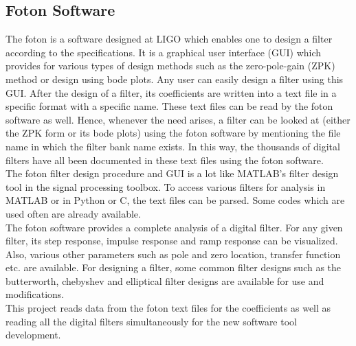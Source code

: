 \documentclass[colorlinks=true,pdfstartview=FitV,linkcolor=blue,
            citecolor=red,urlcolor=magenta]{ligodoc}
\begin{document}
	\subsection{Foton Software}  The foton is a software designed at LIGO which enables one to design a filter according to the specifications. It is a graphical user interface (GUI) which provides for various types of design methods such as the zero-pole-gain (ZPK) method or design using bode plots. Any user can easily design a filter using this GUI. After the design of a filter, its coefficients are written into a text file in a specific format with a specific name. These text files can be read by the foton software as well. Hence, whenever the need arises, a filter can be looked at (either the ZPK form or its bode plots) using the foton software by mentioning the file name in which the filter bank name exists. In this way, the thousands of digital filters have all been documented in these text files using the foton software. \\The foton filter design procedure and GUI is a lot like MATLAB's filter design tool in the signal processing toolbox. To access various filters for analysis in MATLAB or in Python or C, the text files can be parsed. Some codes which are used often are already available. \\
	The foton software provides a complete analysis of a digital filter. For any given filter, its step response, impulse response and ramp response can be visualized. Also, various other parameters such as pole and zero location, transfer function etc. are available. For designing a filter, some common filter designs such as the butterworth, chebyshev and elliptical filter designs are available for use and modifications. \\This project reads data from the foton text files for the coefficients as well as reading all the digital filters simultaneously for the new software tool development. 
\end{document}

